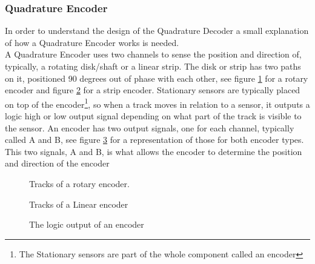 \documentclass[../../../main]{subfiles}
\begin{document}
\subsubsection{Quadrature Encoder}
\label{sub:Theory}
In order to understand the design of the Quadrature Decoder a small explanation of how a Quadrature Encoder works is needed. \\
A Quadrature Encoder uses two channels to sense the position and direction of, typically, a rotating disk/shaft or a linear strip. The disk or strip has two paths on it, positioned 90 degrees out of phase with each other, see figure \ref{rotary_encoder} for a rotary encoder and figure \ref{channels} for a strip encoder. Stationary sensors are typically placed on top of the encoder\footnote{The Stationary sensors are part of the whole component called an encoder}, so when a track moves in relation to a sensor, it outputs a logic high or low output signal depending on what part of the track is visible to the sensor. An encoder has two output signals, one for each channel, typically called A and B, see figure \ref{output_channels} for a representation of those for both encoder types. This two signals, A and B, is what allows the encoder to determine the position and direction of the encoder

\begin{figure}[H]
  \centering
  \def\svgwidth{0.4\columnwidth}
  \fontsize{9}{9}\selectfont
  
  \caption{Tracks of a rotary encoder.}
  \label{rotary_encoder}
\end{figure}

\begin{figure}[H]
  \centering
  \def\svgwidth{0.7\columnwidth}
  \fontsize{9}{9}\selectfont
  
  \caption{Tracks of a Linear encoder}
  \label{channels}
\end{figure}

\begin{figure}[H]
  \centering
  \def\svgwidth{0.7\columnwidth}
  \fontsize{9}{9}\selectfont
  
  \caption{The logic output of an encoder}
  \label{output_channels}
\end{figure}
\end{document}
